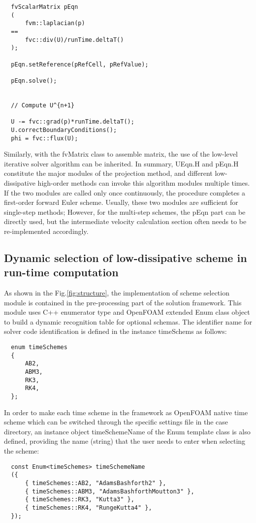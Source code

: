 \documentclass{article}
\begin{document}
\begin{lstlisting}
  fvScalarMatrix pEqn
  (
      fvm::laplacian(p)
  ==
      fvc::div(U)/runTime.deltaT()
  );

  pEqn.setReference(pRefCell, pRefValue);

  pEqn.solve();


  // Compute U^{n+1}

  U -= fvc::grad(p)*runTime.deltaT();
  U.correctBoundaryConditions();
  phi = fvc::flux(U);
\end{lstlisting}

Similarly, with the fvMatrix class to assemble matrix, the use of the low-level iterative solver algorithm can be inherited. In summary, UEqn.H and pEqn.H constitute the major modules of the projection method, and different low-dissipative high-order methods can invoke this algorithm modules multiple times. If the two modules are called only once continuously, the procedure completes a first-order forward Euler scheme. Usually, these two modules are sufficient for single-step methods; However, for the multi-step schemes, the pEqn part can be directly used, but the intermediate velocity calculation section often needs to be re-implemented accordingly.


\subsection{Dynamic selection of low-dissipative scheme in run-time computation}

As shown in the Fig.\ref{fig:structure}, the implementation of scheme selection module is contained in the pre-processing part of the solution framework. This module uses C++ enumerator type and OpenFOAM extended Enum class object to build a dynamic recognition table for optional schemas. The identifier name for solver code identification is defined in the instance timeSchems as follows:

\begin{lstlisting}
  enum timeSchemes
  {
      AB2,
      ABM3,
      RK3,
      RK4,
  };
\end{lstlisting}

In order to make each time scheme in the framework as OpenFOAM native time scheme which can be switched through the specific settings file in the case directory, an instance object timeSchemeName of the Enum template class is also defined, providing the name (string) that the user needs to enter when selecting the scheme:

\begin{lstlisting}
  const Enum<timeSchemes> timeSchemeName
  ({
      { timeSchemes::AB2, "AdamsBashforth2" },
      { timeSchemes::ABM3, "AdamsBashforthMoutton3" },
      { timeSchemes::RK3, "Kutta3" },
      { timeSchemes::RK4, "RungeKutta4" },
  });
\end{lstlisting}
\end{document}
